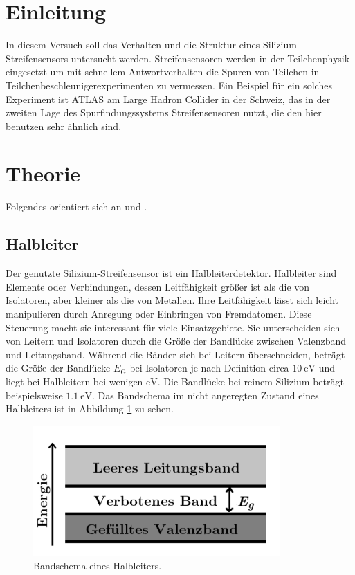 \section{Einleitung}

In diesem Versuch soll das Verhalten und die Struktur eines Silizium-Streifensensors untersucht werden. Streifensensoren werden in der Teilchenphysik eingesetzt um mit schnellem Antwortverhalten die Spuren von Teilchen in Teilchenbeschleunigerexperimenten zu vermessen. Ein Beispiel für ein solches Experiment ist ATLAS am Large Hadron Collider in der Schweiz, das in der zweiten Lage des Spurfindungssystems Streifensensoren nutzt, die den hier benutzen sehr ähnlich sind.


\section{Theorie}
\label{sec:Theorie}

Folgendes orientiert sich an \cite{anleitung} und \cite{goessling}.

\subsection{Halbleiter}

Der genutzte Silizium-Streifensensor ist ein Halbleiterdetektor. Halbleiter sind Elemente oder Verbindungen, dessen Leitfähigkeit größer ist als die von Isolatoren, aber kleiner als die von Metallen. Ihre Leitfähigkeit lässt sich leicht manipulieren durch Anregung oder Einbringen von Fremdatomen. Diese Steuerung macht sie interessant für viele Einsatzgebiete.
Sie unterscheiden sich von Leitern und Isolatoren durch die Größe der Bandlücke zwischen Valenzband und Leitungsband. Während die Bänder sich bei Leitern überschneiden, beträgt die Größe der Bandlücke $E_\text{G}$ bei Isolatoren je nach Definition circa $\SI{10}{\electronvolt}$ und liegt bei Halbleitern bei wenigen $\si{\electronvolt}$. Die Bandlücke bei reinem Silizium beträgt beispielsweise $\SI{1.1}{\electronvolt}$. Das Bandschema im nicht angeregten Zustand eines Halbleiters ist in Abbildung \ref{fig:bandmodell} zu sehen.

\begin{figure}
  \centering
  \includegraphics[height=5cm]{TimosAufrisse/bandmodell.png}
  \caption{Bandschema eines Halbleiters\cite{anleitung}.}
  \label{fig:bandmodell}
\end{figure}

